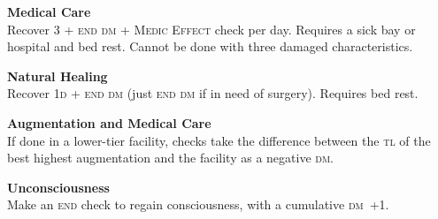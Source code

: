 \documentclass[10pt]{article}
\newcommand\dice[1]{\textsc{#1}}
\newcommand{\diemod}[1]{\textsc{dm}~#1}
\begin{document}
\begin{multicols}{2}
\textbf{Medical Care}\\
Recover \dice{3 + end dm + Medic Effect} check per day.  Requires a
sick bay or hospital and bed rest.  Cannot be done with three damaged
characteristics.

\textbf{Natural Healing}\\
Recover \dice{1d + end dm} (just \textsc{end dm} if in need of
surgery).  Requires bed rest.

\textbf{Augmentation and Medical Care}\\
If done in a lower-tier facility, checks take the difference between
the \textsc{tl} of the best highest augmentation and the facility as a
negative \textsc{dm}.

\textbf{Unconsciousness}\\
Make an \textsc{end} check to regain consciousness, with a cumulative
\diemod{+1}.
\end{multicols}
\end{document}
